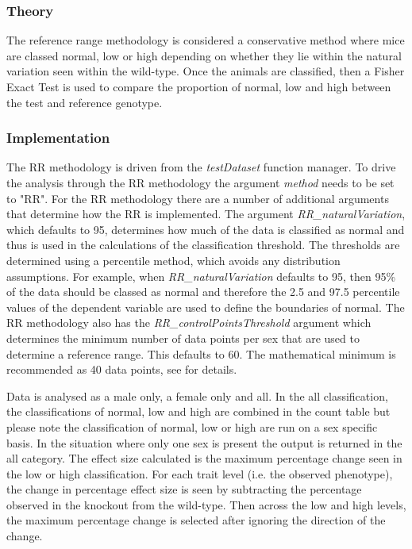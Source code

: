 \documentclass[12pt,a4paper]{article}
\begin{document}
\subsubsection{Theory}
The reference range methodology is considered a conservative method where mice are classed normal, low or high depending on whether they lie within the natural variation seen within the wild-type. Once the animals are classified, then a Fisher Exact Test is used to compare the proportion of normal, low and high between the test and reference genotype. 

\subsubsection{Implementation}
The RR methodology is driven from the \textit{testDataset} function manager. To drive the analysis through the RR methodology the argument \textit{method} needs to be set to "RR".  For the RR methodology there are a number of additional arguments that determine how the RR is implemented. The argument \textit{RR\_naturalVariation}, which defaults to 95, determines how much of the data is classified as normal and thus is used in the calculations of the classification threshold. The thresholds are determined using a percentile method, which avoids any distribution assumptions. 
For example, when \textit{RR\_naturalVariation} defaults to 95, then 95\%  of the data should be classed as normal and therefore the 2.5 and 97.5 percentile values of the dependent variable are used to define the boundaries of normal. The RR methodology also has the \textit{RR\_controlPointsThreshold} argument which determines the minimum number of data points per sex that are used to determine a reference range.  This defaults to 60. The mathematical minimum is recommended as 40 data points, see \cite{Solberg} for details.

Data is analysed as a male only, a female only and all. In the all classification, the classifications of normal, low and high are combined in the count table but please note the classification of normal, low or high are run on a sex specific basis.  In the situation where only one sex is present the output is returned in the all category.
The effect size calculated is the maximum percentage change seen in the low or high classification. For each trait level (i.e. the observed phenotype), the change in percentage effect size is seen by subtracting the percentage observed in the knockout from the wild-type. Then across the low and high levels, the maximum percentage change is selected after ignoring the direction of the change.
\end{document}
